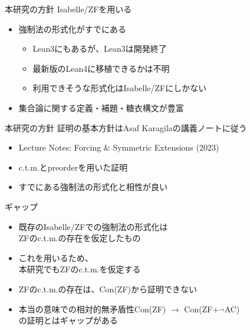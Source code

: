 \documentclass[17pt,aspectratio=169]{beamer}
\begin{document}
\begin{frame}{本研究の方針}
    \vspace{10pt}
    Isabelle/ZFを用いる
    {\small 
    \begin{itemize}
        \item 強制法の形式化がすでにある
        \begin{itemize}
            \item Lean3にもあるが、Lean3は開発終了
            \item 最新版のLean4に移植できるかは不明
            \item 利用できそうな形式化はIsabelle/ZFにしかない
        \end{itemize}
        \item 集合論に関する定義・補題・糖衣構文が豊富
    \end{itemize}
    }
\end{frame}

\begin{frame}{本研究の方針}
    \vspace{10pt}
    証明の基本方針はAsaf Karagilaの講義ノートに従う
    {\small \begin{itemize}
        \item Lecture Notes: Forcing \& Symmetric Extensions (2023)
        \item c.t.m.とpreorderを用いた証明
        \item すでにある強制法の形式化と相性が良い
    \end{itemize} }

\end{frame}

\begin{frame}{ギャップ}
    \vspace{-15pt}
    \,
    {\small 
    \begin{itemize}[itemsep=5pt]
        \item 既存のIsabelle/ZFでの強制法の形式化は\\ZFのc.t.m.の存在を仮定したもの
        \item これを用いるため、\\本研究でもZFのc.t.m.を仮定する
        \item ZFのc.t.m.の存在は、Con(ZF)から証明できない
        \item 本当の意味での相対的無矛盾性Con(ZF) $\rightarrow$ Con(ZF+$\neg$AC)\\
        の証明とはギャップがある
    \end{itemize}
    }
\end{frame}
\end{document}
